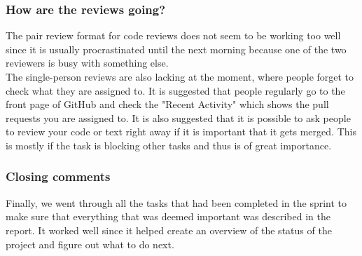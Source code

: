 \subsubsection*{How are the reviews going?}
The pair review format for code reviews does not seem to be working too well since it is usually procrastinated until the next morning because one of the two reviewers is busy with something else.
\\
The single-person reviews are also lacking at the moment, where people forget to check what they are assigned to.
It is suggested that people regularly go to the front page of GitHub and check the "Recent Activity" which shows the pull requests you are assigned to.
It is also suggested that it is possible to ask people to review your code or text right away if it is important that it gets merged.
This is mostly if the task is blocking other tasks and thus is of great importance.


\subsubsection*{Closing comments}
Finally, we went through all the tasks that had been completed in the sprint to make sure that everything that was deemed important was described in the report.
It worked well since it helped create an overview of the status of the project and figure out what to do next.